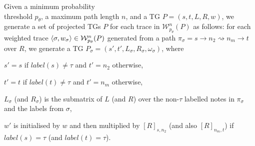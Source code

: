 	\begin{definition}
		Given a minimum probability\\ threshold $p_\theta$, a maximum path length $n$, and a TG $P=(s,t,L,R,w)$, we generate a set of projected TGs $P$ for each trace in $\mathcal{W}_{p_\theta}^n(P)$ as follows: for each weighted trace $\braket{\sigma,w_\sigma}\in\mathcal{W}_{p_\theta}^n(P)$ generated from a path $\pi_\sigma=s\to n_2\rightsquigarrow n_m\to t$ over $R$, we generate a TG $P_\sigma=(s',t',L_\sigma,R_\sigma,\omega_\sigma)$, where \begin{alphalist}
			\item $s'=s$ if $\textit{label}(s)\neq \tau$ and $t'=n_2$ otherwise,
			\item $t'=t$ if $\textit{label}(t)\neq \tau$ and $t'=n_m$ otherwise,
			\item $L_\sigma$ (and $R_\sigma$) is the submatrix of $L$ (and $R$) over the non-$\tau$ labelled notes in $\pi_\sigma$ and the labels from $\sigma$,
			\item $w'$ is initialised by $w$ and then multiplied by $[R]_{s,n_2}$ (and also $[R]_{n_m,t}$) if $\textit{label}(s)=\tau$ (and  $\textit{label}(t)=\tau$).
		\end{alphalist}
	\end{definition}

